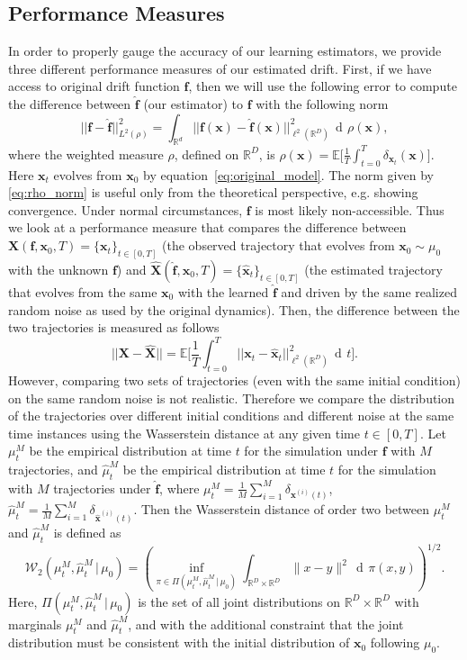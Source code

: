 \documentclass[11pt]{article} %
\def\eqref#1{equation~\ref{#1}}
\def\rvx{{\mathbf{x}}}
\def\rmX{{\mathbf{X}}}
\def\vf{{\bm{f}}}
\newcommand{\E}{\mathbb{E}}
\newcommand{\R}{\mathbb{R}}
\DeclareMathOperator{\dif}{d \!}        %
\newcommand{\norm}[1]{||#1||}
\begin{document}
\subsection{Performance Measures}\label{subsec:Performance Measures}
%
In order to properly gauge the accuracy of our learning estimators, we provide three different performance measures of our estimated drift.  First, if we have access to original drift function $\vf$, then we will use the following error to compute the difference between $\hat\vf$ (our estimator) to $\vf$ with the following norm
\begin{equation}\label{eq:rho_norm}
    \norm{\vf - \hat\vf}_{L^2(\rho)}^2 = \int_{\R^d}\norm{\vf(\rvx) - \hat\vf(\rvx)}_{\ell^2(\R^D)}^2 \, \dif \rho(\rvx),
\end{equation}
where the weighted measure $\rho$,  defined on $\R^D$, is $\rho(\rvx) = \E\Big[\frac{1}{T}\int_{t = 0}^T\delta_{\rvx_t}(\rvx)\Big]$.  Here $\rvx_t$ evolves from $\rvx_0$ by \eqref{eq:original_model}. The norm given by \ref{eq:rho_norm} is useful only from the theoretical perspective, e.g. showing convergence.  Under normal circumstances, $\vf$ is most likely non-accessible.  Thus we look at a performance measure that compares the difference between $\rmX(\vf, \rvx_0, T) = \{\rvx_t\}_{t \in [0, T]}$ (the observed trajectory that evolves from $\rvx_0 \sim \mu_0$ with the unknown $\vf$) and $\hat\rmX(\hat\vf, \rvx_0, T) = \{\hat\rvx_t\}_{t \in [0, T]}$ (the estimated trajectory that evolves from the same $\rvx_0$ with the learned $\hat\vf$ and driven by the same realized random noise as used by the original dynamics).  Then, the difference between the two trajectories is measured as follows
\begin{equation}\label{eq:traj_norm}
\norm{\rmX - \hat\rmX} = \E\Big[\frac{1}{T}\int_{t = 0}^T\norm{\rvx_t - \hat\rvx_t}_{\ell^2(\R^D)}^2 \, \dif t\Big].
\end{equation}
However, comparing two sets of trajectories (even with the same initial condition) on the same random noise is not realistic. Therefore we compare the distribution of the trajectories over different initial conditions and different noise at the same time instances using the Wasserstein distance at any given time $t \in [0, T]$. Let $\mu^M_t$ be the empirical distribution at time $t$ for the simulation under $\vf$ with $M$ trajectories, and $\hat{\mu}^M_t$ be the empirical distribution at time $t$ for the simulation with $M$ trajectories under $\hat{\vf}$, where $\mu^M_t = \frac{1}{M} \sum_{i=1}^M \delta_{\rvx^{(i)}(t)}$, $\hat{\mu}^M_t = \frac{1}{M} \sum_{i=1}^M \delta_{\hat{\rvx}^{(i)}(t)}$. Then the Wasserstein distance of order two between $\mu^M_t$ and $\hat{\mu}^M_t$ is defined  as
\begin{equation}\label{eq:wass_dis}
\mathcal{W}_2(\mu^M_t, \hat{\mu}^M_t \,|\, \mu_0)= \left( \inf_{\pi \in \Pi(\mu^M_t, \hat{\mu}^M_t \,|\, \mu_0)} \int_{\R^D \times \R^D} \|x - y\|^2 \, \dif \pi(x, y) \right)^{1/2}.
\end{equation}
Here, $\Pi(\mu^M_t, \hat{\mu}^M_t \,|\, \mu_0)$ is the set of all joint distributions on $\R^D \times \R^D$ with marginals $\mu^M_t$ and $\hat{\mu}^M_t$, and with the additional constraint that the joint distribution must be consistent with the initial distribution of $\rvx_0$ following $\mu_0$.
%
\end{document}

